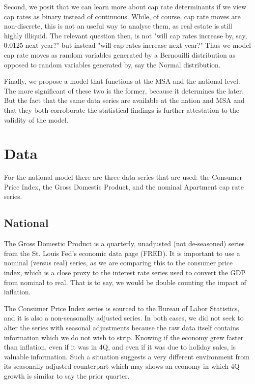 Second, we posit that we can learn more about cap rate determinants if we view cap rates as binary instead of continuous. While, of course, cap rate moves are non-discrete, this is not an useful way to analyse them, as real estate is still highly illiquid. The relevant question then, is not "will cap rates increase by, say,  0.0125 next year?" but instead "will cap rates increase next year?" Thus we model cap rate moves as random variables generated by a Bernouilli distribution as opposed to random variables generated by, say the Normal distribution. 

Finally, we propose a model that functions at the MSA and the national level. The more significant of these two is the former, because it determines the later. But the fact that the same data series are available at the nation and MSA and that they both corroborate the statistical findings is further attestation to the validity of the model.

\section{Data}
For the national model there are three data series that are used: the Consumer Price Index, the Gross Domestic Product, and the nominal Apartment cap rate series. 

\subsection{National}
The Gross Domestic Product is a quarterly, unadjusted (not de-seasoned) series from the St. Louis Fed's economic data page (FRED). It is important to use a nominal (versus real) series, as we are comparing this to the consumer price index, which is a close proxy to the interest rate series used to convert the GDP from nominal to real. That is to say, we would be double counting the impact of inflation.

The Consumer Price Index series is sourced to the Bureau of Labor Statistics, and it is also a non-seasonally adjusted series. In both cases, we did not seek to alter the series with seasonal adjustments because the raw data itself contains information which we do not wish to strip. Knowing if the economy grew faster than inflation, even if it was in 4Q, and even if it was due to holiday sales, is valuable information. Such a situation suggests a very different environment from its seasonally adjusted counterpart which may shows an economy in which 4Q growth is similar to say the prior quarter.

